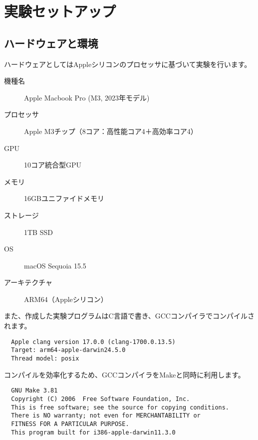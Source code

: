\documentclass[a4j, 12pt]{jarticle}
\begin{document}
\section{実験セットアップ}
\subsection{ハードウェアと環境}
ハードウェアとしてはAppleシリコンのプロセッサに基づいて実験を行います。
\begin{description}
  \item[機種名] Apple Macbook Pro (M3, 2023年モデル)
  \item[プロセッサ] Apple M3チップ（8コア：高性能コア4＋高効率コア4）
  \item[GPU] 10コア統合型GPU
  \item[メモリ] 16GBユニファイドメモリ
  \item[ストレージ] 1TB SSD
  \item[OS] macOS Sequoia 15.5
  \item[アーキテクチャ] ARM64（Appleシリコン） 
\end{description}
また、作成した実験プログラムはC言語で書き、GCCコンパイラでコンパイルされます。
\begin{verbatim}
  Apple clang version 17.0.0 (clang-1700.0.13.5)
  Target: arm64-apple-darwin24.5.0
  Thread model: posix
\end{verbatim}
コンパイルを効率化するため、GCCコンパイラをMakeと同時に利用します。
\begin{verbatim}
  GNU Make 3.81
  Copyright (C) 2006  Free Software Foundation, Inc.
  This is free software; see the source for copying conditions.
  There is NO warranty; not even for MERCHANTABILITY or 
  FITNESS FOR A PARTICULAR PURPOSE.
  This program built for i386-apple-darwin11.3.0
\end{verbatim}
\end{document}
